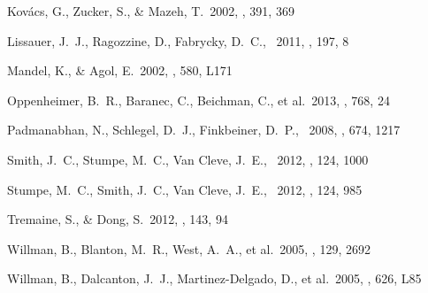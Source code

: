 \documentclass[letterpaper,12pt,preprint]{hack_aastex}
\begin{document}
\begin{thebibliography}{}
Kov{\'a}cs, G., Zucker, S., \& Mazeh, T.\ 2002, \aap, 391, 369

Lissauer, J.~J., Ragozzine, D., Fabrycky, D.~C., \etal\ 2011, \apjs, 197, 8

Mandel, K., \& Agol, E.\ 2002, \apjl, 580, L171

Oppenheimer, B.~R., Baranec, C., Beichman, C., et al.\ 2013, \apj, 768, 24

Padmanabhan, N., Schlegel, D.~J., Finkbeiner, D.~P., \etal\ 2008, \apj, 674, 1217

Smith, J.~C., Stumpe, M.~C., Van Cleve, J.~E., \etal\ 2012, \pasp, 124, 1000

Stumpe, M.~C., Smith, J.~C., Van Cleve, J.~E., \etal\ 2012, \pasp, 124, 985

Tremaine, S., \& Dong, S.\ 2012, \aj, 143, 94

Willman, B., Blanton, M.~R., West, A.~A., et al.\ 2005, \aj, 129, 2692

Willman, B., Dalcanton, J.~J., Martinez-Delgado, D., et al.\ 2005, \apjl, 626, L85
\end{thebibliography}
\end{document}
